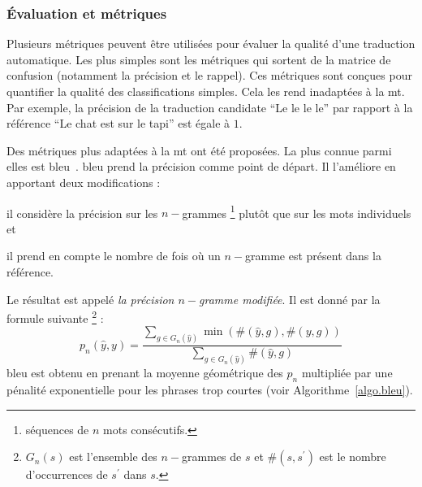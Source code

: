 \subsubsection{Évaluation et métriques}

Plusieurs métriques peuvent être utilisées pour évaluer la qualité d'une traduction automatique.
Les plus simples sont les métriques qui sortent de la matrice de confusion (notamment la précision et le rappel).
Ces métriques sont conçues pour quantifier la qualité des classifications simples.
Cela les rend inadaptées à la \gls{mt}.
Par exemple, la précision de la traduction candidate ``Le le le le'' 
par rapport à la référence ``Le chat est sur le tapi'' est égale à \(1\).

Des métriques plus adaptées à la \gls{mt} ont été proposées.
La plus connue parmi elles est \gls{bleu}~\cite{Papineni_Roukos_Ward_Zhu_2002}.
\gls{bleu} prend la précision comme point de départ.
Il l'améliore en apportant deux modifications :
\begin{enumerate*}
    \item il considère la précision sur les \(n-\)grammes%
    \footnote{séquences de \(n\) mots consécutifs.} %
    plutôt que sur les mots individuels et
    \item il prend en compte le nombre de fois où un \(n-\)gramme est présent dans la référence.
\end{enumerate*}
Le résultat est appelé \emph{la précision \(n-\)gramme modifiée}.
Il est donné par la formule suivante%
\footnote{%
    \(G_n\left(s\right)\) est l'ensemble des \(n-\)grammes de \(s\) et \(\#(s, s^\prime)\) est le nombre d'occurrences de \(s^\prime\) dans \(s\).} :%
\begin{equation}
    \label{eq:mod-ng-prec}
    p_n\left(\hat{y}, y\right) = 
    \frac{\sum\limits_{g \in G_n\left(\hat{y}\right)} \min{\left(\#(\hat{y}, g), \#(y, g)\right)}}
    {\sum\limits_{g \in G_n\left(\hat{y}\right)} \#(\hat{y}, g)}
\end{equation}
\gls{bleu} est obtenu en prenant la moyenne géométrique des \(p_n\) 
multipliée par une pénalité exponentielle pour les phrases trop courtes (voir Algorithme~\ref{algo.bleu}).

